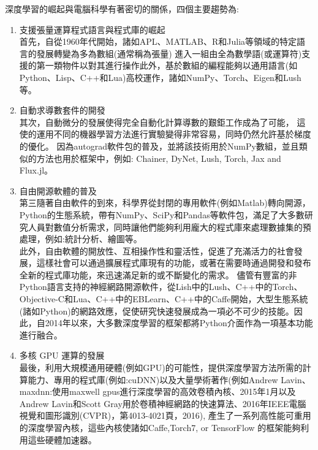 \documentclass[14pt,a4paper]{report}  %
\begin{document}
\qquad 深度學習的崛起與電腦科學有著密切的關係，四個主要趨勢為:\\
\begin{enumerate}
\item 支援張量運算程式語言與程式庫的崛起\\[6pt]
首先，自從1960年代開始，諸如APL、MATLAB、R和Julia等領域的特定語言的發展轉變為多為數組(通常稱為張量) 進入一組由全為數學語(或運算符)支援的第一類物件以對其進行操作此外，基於數組的編程能夠以通用語言(如 Python、Lisp、C++和Lua)高校運作，諸如NumPy、Torch、Eigen和Lush等。\\

\item 自動求導數套件的開發\\[6pt]
其次，自動微分的發展使得完全自動化計算導數的艱鉅工作成為了可能， 這使的運用不同的機器學習方法進行實驗變得非常容易，同時仍然允許基於梯度的優化。 因為autograd軟件包的普及，並將該技術用於NumPy數組，並且類似的方法也用於框架中，例如: Chainer, DyNet, Lush, Torch, Jax and Flux.jl。\\

\item 自由開源軟體的普及\\[6pt]
第三隨著自由軟件的到來，科學界從封閉的專用軟件(例如Matlab)轉向開源， Python的生態系統，帶有NumPy、SciPy和Pandas等軟件包，滿足了大多數研究人員對數值分析需求，同時讓他們能夠利用龐大的程式庫來處理數據集的預處理，例如:統計分析、繪圖等。\\
此外，自由軟體的開放性、互相操作性和靈活性，促進了充滿活力的社會發展，這樣社會可以通過擴展程式庫現有的功能，或著在需要時通過開發和發布全新的程式庫功能，來迅速滿足新的或不斷變化的需求。 儘管有豐富的非Python語言支持的神經網路開源軟件，從Lish中的Lush、C++中的Torch、Objective-C和Lua、C++中的EBLearn、C++中的Caffe開始，大型生態系統(諸如Python)的網路效應，促使研究快速發展成為一項必不可少的技能。因此，自2014年以來，大多數深度學習的框架都將Python介面作為一項基本功能進行融合。\\

\item 多核 GPU 運算的發展 \\[6pt]
最後，利用大規模通用硬體(例如GPU)的可能性，提供深度學習方法所需的計算能力、專用的程式庫(例如:cuDNN)以及大量學術著作(例如Andrew Lavin、maxdnn:使用maxwell gpus進行深度學習的高效卷積內核、2015年1月以及Andrew Lavin和Scott Gray用於卷積神經網路的快速算法、2016年IEEE電腦視覺和圖形識別(CVPR)，第4013-4021頁，2016), 產生了一系列高性能可重用的深度學習內核，這些內核使諸如Caffe,Torch7, or TensorFlow 的框架能夠利用這些硬體加速器。\\
\end{enumerate}
\end{document}
